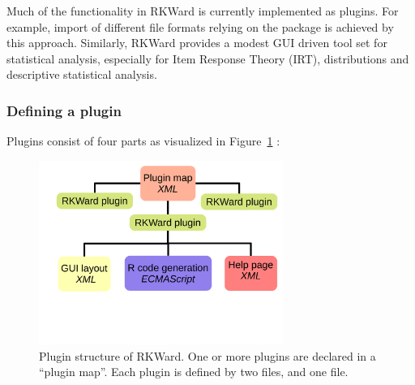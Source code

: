 Much of the functionality in RKWard is currently implemented as plugins. For example, import of different file
formats relying on the  package is achieved by this approach. Similarly,
RKWard provides a modest GUI driven tool set for statistical analysis,
especially for Item Response Theory (IRT), distributions and descriptive
statistical analysis.

\subsubsection{Defining a plugin}
\label{sec:technical_plugins_defining}
Plugins consist of four parts as visualized in Figure~\ref{fig:plugin_structure} 
\citep[see section~\ref{sec:example_plugin} for an example; for a complete
manual, see][]{Friedrichsmeier2010}:

\begin{figure}[htp]
 \centering
 \includegraphics[width=8cm]{../figures/plugin_structure.pdf}
 \caption{Plugin structure of RKWard. One or more plugins are declared in a ``plugin map''. Each plugin is defined by
 two  files, and one  file.}
 \label{fig:plugin_structure}
\end{figure}

